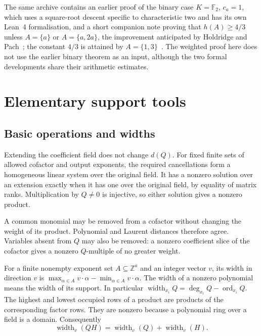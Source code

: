 \documentclass[11pt]{article}
\numberwithin{equation}{section}
\theoremstyle{definition}\newtheorem{definition}[theorem]{Definition}
\theoremstyle{remark}\newtheorem{remark}[theorem]{Remark}
\begin{document}
The same archive contains an earlier proof of the binary case
$K=\mathbb F_2$, $c_a=1$, which uses a square-root descent specific to
characteristic two and has its own Lean~4 formalisation, and a short
companion note proving that $h(A)\ge4/3$ unless $A=\{a\}$ or
$A=\{a,2a\}$, the improvement anticipated by Holdridge and
Pach~\cite[Remark~1.9]{HP}; the constant $4/3$ is attained by
$A=\{1,3\}$~\cite[Lemma~5.6]{HP}. The weighted proof here does not use the earlier binary
theorem as an input, although the two formal developments share their
arithmetic estimates.
\par\endgroup

\section{Elementary support tools}
\label{sec:tools}

\subsection{Basic operations and widths}

Extending the coefficient field does not change $d(Q)$. For fixed
finite sets of allowed cofactor and output exponents, the required
cancellations form a
homogeneous linear system over the original field. It has a nonzero
solution over an extension exactly when it has one over the original
field, by equality of matrix ranks. Multiplication by $Q\ne0$ is
injective, so either solution gives a nonzero product.

A common monomial may be removed from a cofactor without changing
the weight of its product. Polynomial and Laurent distances therefore
agree. Variables absent from $Q$ may also be removed: a nonzero
coefficient slice of the cofactor gives a nonzero $Q$-multiple of no
greater weight.

For a finite nonempty exponent set $A\subseteq\mathbb Z^a$ and an
integer vector $v$, its width in direction $v$ is
$\max_{\alpha\in A}v\cdot\alpha-\min_{\alpha\in A}v\cdot\alpha$.
The width of a nonzero polynomial means the width of its support.
In particular $\operatorname{width}_{x_i}Q=
\deg_{x_i}Q-\operatorname{ord}_{x_i}Q$.
The highest and lowest occupied rows of a product are products of
the corresponding factor rows. They are nonzero because a polynomial
ring over a field is a domain. Consequently
\begin{equation}\label{eq:width-additivity}
 \operatorname{width}_v(QH)=
 \operatorname{width}_v(Q)+\operatorname{width}_v(H).
\end{equation}
\end{document}
